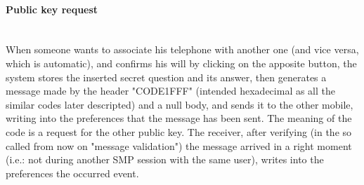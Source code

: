 \paragraph{Public key request} \hspace{0pt} \\
When someone wants to associate his telephone with another one (and vice versa, which is automatic), and confirms his will by clicking on the apposite button, the system stores the inserted secret question and its answer, then generates a message made by the header "CODE1FFF" (intended hexadecimal as all the similar codes later descripted) and a null body, and sends it to the other mobile, writing into the preferences that the message has been sent. The meaning of the code is a request for the other public key. The receiver, after verifying (in the so called from now on "message validation") the message arrived in a right moment (i.e.: not during another SMP session with the same user), writes into the preferences the occurred event.